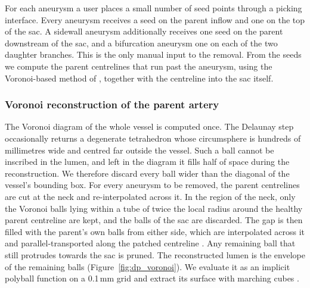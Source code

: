 For each aneurysm a user places a small number of seed points through a picking interface. Every aneurysm receives a seed on the parent inflow and one on the top of the sac. A sidewall aneurysm additionally receives one seed on the parent downstream of the sac, and a bifurcation aneurysm one on each of the two daughter branches. This is the only manual input to the removal. From the seeds we compute the parent centrelines that run past the aneurysm, using the Voronoi-based method of \citet{antiga2004}, together with the centreline into the sac itself.

\subsubsection*{Voronoi reconstruction of the parent artery}

The Voronoi diagram of the whole vessel is computed once. The Delaunay step occasionally returns a degenerate tetrahedron whose circumsphere is hundreds of millimetres wide and centred far outside the vessel. Such a ball cannot be inscribed in the lumen, and left in the diagram it fills half of space during the reconstruction. We therefore discard every ball wider than the diagonal of the vessel's bounding box. For every aneurysm to be removed, the parent centrelines are cut at the neck and re-interpolated across it. In the region of the neck, only the Voronoi balls lying within a tube of twice the local radius around the healthy parent centreline are kept, and the balls of the sac are discarded. The gap is then filled with the parent's own balls from either side, which are interpolated across it and parallel-transported along the patched centreline \citep{ford2009}. Any remaining ball that still protrudes towards the sac is pruned. The reconstructed lumen is the envelope of the remaining balls (Figure~\ref{fig:dp_voronoi}). We evaluate it as an implicit polyball function on a 0.1\,mm grid and extract its surface with marching cubes \citep{lorensen1987}.

